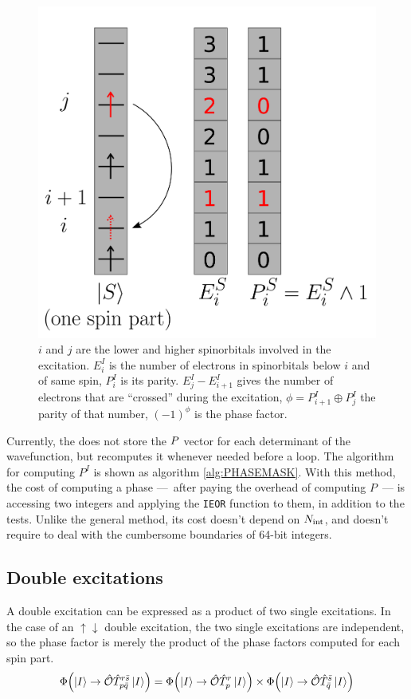 \documentclass[./thesis.tex]{subfiles}
\begin{document}
                
\begin{figure}[h!]
	\begin{center}
		\includegraphics[width=0.5\columnwidth]{figures/determinant_driven/phase}
		\caption[phase mask illustration]{
		$i$ and $j$ are the lower and higher spinorbitals involved in the excitation. $E_i^I$ is the number of electrons in spinorbitals below $i$ and of same spin, $P_i^I$ is its parity. $E_j^I - E_{i+1}^I$ gives the number of electrons that are ``crossed'' during the excitation, $\phi = P^I_{i+1} \oplus P^I_j$ the parity of that number, $(-1)^\phi$ is the phase factor.
		}
		\label{generators_selectors}
	\end{center}
\end{figure}


Currently, the \QP does not store the ${{{P}}}$ vector for each determinant of the wavefunction, but recomputes it whenever needed before a loop.
The algorithm for computing $P^I$ is shown as algorithm \ref{alg:PHASEMASK}. 
With this method, the cost of computing a phase ---~after paying the overhead of computing $P$~--- is accessing two integers and applying the \lstinline{IEOR} function to them, in addition to the tests. Unlike the general method, its cost doesn't depend on ${N_\text{int}}$, and doesn't require to deal with the cumbersome boundaries of 64-bit integers.



\subsection{Double excitations}


A double excitation can be expressed as a product of two single excitations.
In the case of an $\uparrow \downarrow$ double excitation, the two single excitations are independent, so the phase factor is merely the product of the phase factors computed for each spin part. 
\begin{equation}
{\Phi \qty(\ket{I} \rightarrow {\hat{\mathcal{O}}}{\hat{T}_{p \bar q}^{r \bar s}} \ket{I})} = 
{\Phi \qty(\ket{I} \rightarrow {\hat{\mathcal{O}}} {\hat{T}_{p}^{r}} \ket{I})} \times
{\Phi \qty(\ket{I} \rightarrow {\hat{\mathcal{O}}}{\hat{T}_{\bar q}^{\bar s}} \ket{I})} 
\end{equation}
\end{document}
